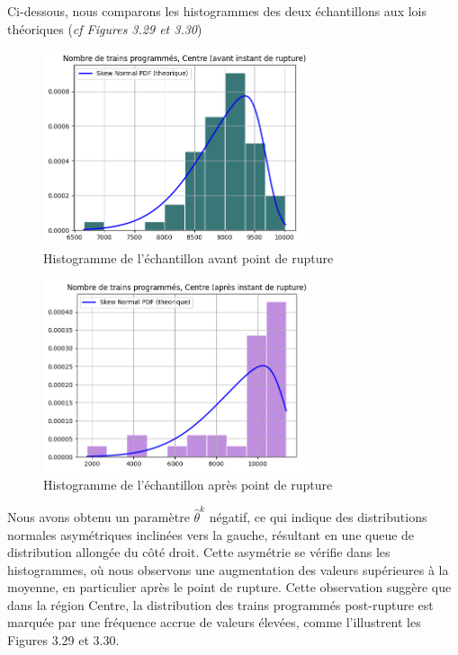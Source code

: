 {Ci-dessous, nous comparons les histogrammes des deux échantillons aux lois théoriques (\textit{cf Figures 3.29 et 3.30})

\begin{figure}[H]
  \centering
  \includegraphics[width=0.7\textwidth]{image/Cn-FIG05.png}
  \caption{Histogramme de l'échantillon avant point de rupture}
\end{figure}

\begin{figure}[H]
  \centering
  \includegraphics[width=0.7\textwidth]{image/Cn-FIG06.png}
  \caption{Histogramme de l'échantillon après point de rupture}
\end{figure}

Nous avons obtenu un paramètre $\hat{\theta}^k$ négatif, ce qui indique des distributions normales asymétriques inclinées vers la gauche, résultant en une queue de distribution allongée du côté droit. Cette asymétrie se vérifie dans les histogrammes, où nous observons une augmentation des valeurs supérieures à la moyenne, en particulier après le point de rupture. Cette observation suggère que dans la région Centre, la distribution des trains programmés post-rupture est marquée par une fréquence accrue de valeurs élevées, comme l'illustrent les Figures 3.29 et 3.30.

}
